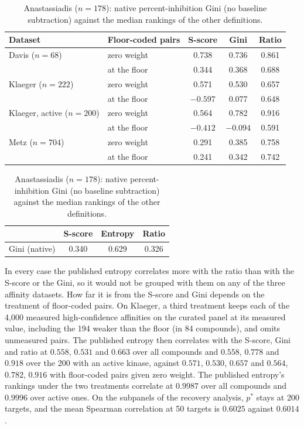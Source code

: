 \documentclass[11pt]{article}
\begin{document}
\begin{table}[h]
\centering
\caption{Spearman correlation of the published entropy (weights inversely
proportional to binding constants) with the median rankings of the other
definitions. The Anastassiadis row gives correlations with the published
percent-inhibition Gini.}
\begin{tabular}{llccc}
\toprule
Dataset & Floor-coded pairs & S-score & Gini & Ratio \\
\midrule
Davis ($n = 68$)            & zero weight    & 0.738    & 0.736    & 0.861 \\
                            & at the floor & 0.344    & 0.368    & 0.688 \\
Klaeger ($n = 222$)         & zero weight    & 0.571    & 0.530    & 0.657 \\
                            & at the floor & $-0.597$ & 0.077    & 0.648 \\
Klaeger, active ($n = 200$) & zero weight    & 0.564    & 0.782    & 0.916 \\
                            & at the floor & $-0.412$ & $-0.094$ & 0.591 \\
Metz ($n = 704$)            & zero weight    & 0.291    & 0.385    & 0.758 \\
                            & at the floor & 0.241    & 0.342    & 0.742 \\
\bottomrule
\end{tabular}

\vspace{1em}
\caption*{Anastassiadis ($n = 178$): native percent-inhibition Gini (no
baseline subtraction) against the median rankings of the other definitions.}
\begin{tabular}{lccc}
\toprule
 & S-score & Entropy & Ratio \\
\midrule
Gini (native) & 0.340 & 0.629 & 0.326 \\
\bottomrule
\end{tabular}
\end{table}

In every case the published entropy correlates more with the ratio than with
the S-score or the Gini, so it would not be grouped with them on any of the
three affinity datasets. How far it is from the S-score and Gini depends on the
treatment of floor-coded pairs. On Klaeger, a third treatment keeps each of the 4{,}000
measured high-confidence affinities on the curated panel at its measured
value, including the 194 weaker than the floor (in 84 compounds), and omits
unmeasured pairs. The published entropy
then correlates with the S-score, Gini and ratio at $0.558$, $0.531$ and $0.663$
over all compounds and $0.558$, $0.778$ and $0.918$ over the 200 with an
active kinase, against $0.571$, $0.530$, $0.657$ and $0.564$, $0.782$, $0.916$
with floor-coded pairs given zero weight. The published entropy's rankings under the two treatments correlate at $0.9987$
over all compounds and $0.9996$ over active ones. On the subpanels of the
recovery analysis, $p^*$ stays at 200 targets, and the mean Spearman
correlation at 50 targets is $0.6025$ against $0.6014$.
\end{document}
